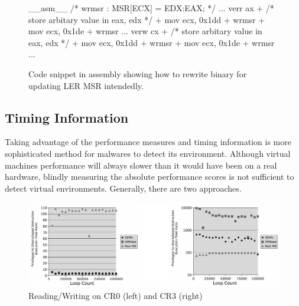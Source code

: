 \begin{figure}[h]
\begin{lstc}
__asm__ {
	/* wrmsr : MSR[ECX] = EDX:EAX; */
	...
	verr ax
+	/* store arbitary value in eax, edx */
+	mov ecx, 0x1dd
+	wrmsr 
+	mov ecx, 0x1de
+	wrmsr
	...
	verw cx
+	/* store arbitary value in eax, edx */
+	mov ecx, 0x1dd
+	wrmsr
+	mov ecx, 0x1de
+	wrmsr
	...
}

\end{lstc}
\caption{\label{fig:wrmsr} Code snippet in assembly showing how to rewrite binary for updating LER MSR intendedly. }
\end{figure}

\subsection{Timing Information}
\label{sec:approach-timing}
Taking advantage of the performance measures and timing information is more sophisticated method for malwares to detect its environment. Although virtual machine\textquotesingle s performance will always slower than it would have been on a real hardware, blindly measuring the absolute performance scores is not sufficient to detect virtual environments.\cite{raffetseder2007} Generally, there are two approaches.

\begin{figure}[!t]
	\centering
	\includegraphics[width=\textwidth]{figure/comp_inst.jpg}
	\caption{Reading/Writing on CR0 (left) and CR3 (right)}
	\label{fig:comparison_of_instructions}
\end{figure}

